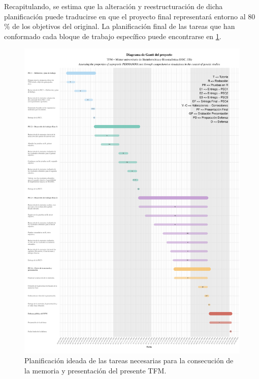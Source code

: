\documentclass[IB,BIB]{TFUOC}%
\begin{document}
Recapitulando, se estima que la alteración y reestructuración de dicha planificación puede traducirse en que el proyecto final representará entorno al 80 \% de los objetivos del original. La planificación final de las tareas que han conformado cada bloque de trabajo específico puede encontrarse en \ref{fig:GANTT_TFM}. 


\begin{figure}[!htbp]
    \centering
    \includegraphics[scale=.5]{TFMGantt.pdf}
    \caption{\scriptsize{Planificación ideada de las tareas necesarias para la consecución de la memoria y presentación del presente TFM.}}
    \label{fig:GANTT_TFM}
\end{figure}
\end{document}

